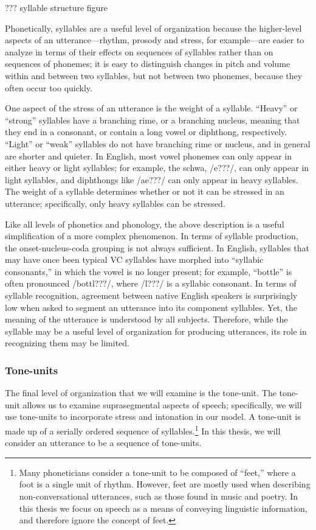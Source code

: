 ??? syllable structure figure

Phonetically, syllables are a useful
level of organization because
the higher-level aspects
of an utterance---rhythm, prosody and stress,
for example---are easier to analyze
in terms of their effects on
sequences of syllables rather than
on sequences of phonemes;
it is easy to distinguish
changes in pitch and volume
within and between two syllables,
but not between two phonemes,
because they often occur too quickly.

One aspect of the stress of an utterance
is the weight of a syllable.
``Heavy'' or ``strong'' syllables
have a branching rime,
or a branching nucleus,
meaning that they
end in a consonant,
or contain a long vowel or diphthong,
respectively.
``Light'' or ``weak'' syllables
do not have branching rime or nucleus,
and in general are shorter
and quieter.
In English, most vowel phonemes
can only appear in either
heavy or light syllables;
for example, the schwa, /e???/,
can only appear in light syllables,
and diphthongs like /ae???/
can only appear in heavy syllables.
The weight of a syllable determines
whether or not it can be stressed
in an utterance;
specifically, only heavy syllables
can be stressed.

Like all levels of phonetics and phonology,
the above description is a useful simplification
of a more complex phenomenon.
In terms of syllable production,
the onset-nucleus-coda grouping
is not always sufficient.
In English, syllables that may have once
been typical VC syllables have morphed
into ``syllabic consonants,'' in which
the vowel is no longer present;
for example, ``bottle'' is often
pronounced /bottl???/,
where /l???/ is a syllabic consonant.
In terms of syllable recognition,
agreement between native English speakers
is surprisingly low when
asked to segment an utterance
into its component syllables.
Yet, the meaning of the utterance
is understood by all subjects.
Therefore, while the syllable
may be a useful level of organization
for producing utterances,
its role in recognizing them
may be limited.

\subsubsection{Tone-units}

The final level of organization
that we will examine is the tone-unit.
The tone-unit allows us to examine
suprasegmental aspects of speech;
specifically, we will use tone-units
to incorporate stress and intonation
in our model.
A tone-unit is made up of a serially ordered
sequence of syllables.\footnote{Many
  phoneticians consider a tone-unit to be
  composed of ``feet,'' where a foot is
  a single unit of rhythm.
  However, feet are mostly used when describing
  non-conversational utterances,
  such as those found in music and poetry.
  In this thesis we focus on speech
  as a means of conveying linguistic information,
  and therefore ignore the concept of feet.}
In this thesis, we will consider
an utterance to be a sequence of tone-units.

